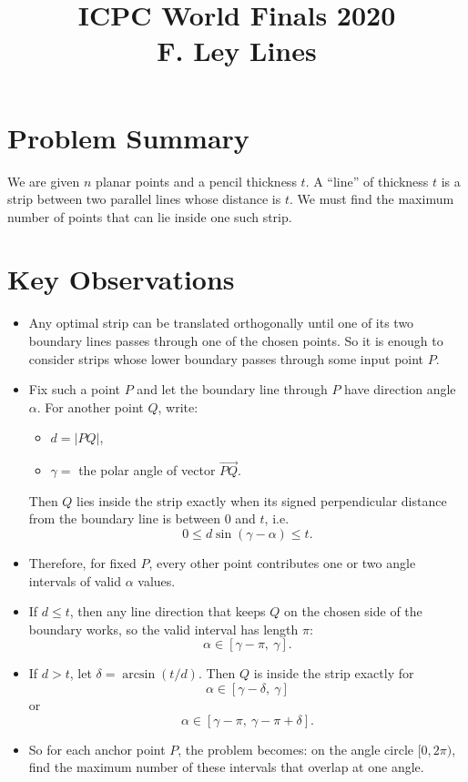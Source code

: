\documentclass[11pt]{article}
\title{ICPC World Finals 2020\\F. Ley Lines}
\author{}
\date{}
\begin{document}
\maketitle

\section*{Problem Summary}

We are given $n$ planar points and a pencil thickness $t$.
A ``line'' of thickness $t$ is a strip between two parallel lines whose distance is $t$.
We must find the maximum number of points that can lie inside one such strip.

\section*{Key Observations}

\begin{itemize}[leftmargin=*]
    \item Any optimal strip can be translated orthogonally until one of its two boundary lines passes through
    one of the chosen points. So it is enough to consider strips whose lower boundary passes through some
    input point $P$.
    \item Fix such a point $P$ and let the boundary line through $P$ have direction angle $\alpha$.
    For another point $Q$, write:
    \begin{itemize}[leftmargin=*]
        \item $d = |PQ|$,
        \item $\gamma =$ the polar angle of vector $\overrightarrow{PQ}$.
    \end{itemize}
    Then $Q$ lies inside the strip exactly when its signed perpendicular distance from the boundary line is
    between $0$ and $t$, i.e.
    \[
        0 \le d \sin(\gamma - \alpha) \le t.
    \]
    \item Therefore, for fixed $P$, every other point contributes one or two angle intervals of valid
    $\alpha$ values.
    \item If $d \le t$, then any line direction that keeps $Q$ on the chosen side of the boundary works, so the
    valid interval has length $\pi$:
    \[
        \alpha \in [\gamma-\pi,\ \gamma].
    \]
    \item If $d > t$, let $\delta = \arcsin(t/d)$.
    Then $Q$ is inside the strip exactly for
    \[
        \alpha \in [\gamma-\delta,\ \gamma]
    \]
    or
    \[
        \alpha \in [\gamma-\pi,\ \gamma-\pi+\delta].
    \]
    \item So for each anchor point $P$, the problem becomes: on the angle circle $[0,2\pi)$, find the maximum
    number of these intervals that overlap at one angle.
\end{itemize}
\end{document}
